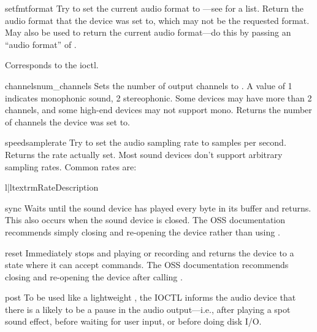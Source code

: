 \begin{methoddesc}{setfmt}{format}
Try to set the current audio format to ---see
 for a list.  Return the audio format that the device
was set to, which may not be the requested format.  May also be used to
return the current audio format---do this by passing an ``audio format''
of
.  

Corresponds to the  ioctl.
\end{methoddesc}

\begin{methoddesc}{channels}{num_channels}
Sets the number of output channels to .  A value of 1
indicates monophonic sound, 2 stereophonic.  Some devices may have more
than 2 channels, and some high-end devices may not support mono.
Returns the number of channels the device was set to.
\end{methoddesc}

\begin{methoddesc}{speed}{samplerate}
Try to set the audio sampling rate to  samples per
second.  Returns the rate actually set.  Most sound devices don't
support arbitrary sampling rates.  Common rates are:
\begin{tableii}{l|l}{textrm}{Rate}{Description}
\end{tableii}
\end{methoddesc}

\begin{methoddesc}{sync}{}
Waits until the sound device has played every byte in its buffer and
returns.  This also occurs when the sound device is closed.  The OSS
documentation recommends simply closing and re-opening the device rather
than using .
\end{methoddesc}

\begin{methoddesc}{reset}{}
Immediately stops and playing or recording and returns the device to a
state where it can accept commands.  The OSS documentation recommends
closing and re-opening the device after calling .
\end{methoddesc}

\begin{methoddesc}{post}{}
To be used like a lightweight , the 
IOCTL informs the audio device that there is a likely to be a pause in
the audio output---i.e., after playing a spot sound effect, before
waiting for user input, or before doing disk I/O.
\end{methoddesc}

